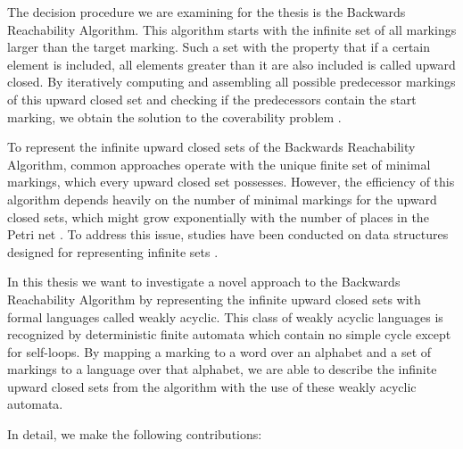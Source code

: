 The decision procedure we are examining for the thesis is the Backwards Reachability Algorithm. This algorithm starts with the infinite set of all markings larger than the target marking. Such a set with the property that if a certain element is included, all elements greater than it are also included is called upward closed. By iteratively computing and assembling all possible predecessor markings of this upward closed set and checking if the predecessors contain the start marking, we obtain the solution to the coverability problem \cite{abdulla_96}. 

To represent the infinite upward closed sets of the Backwards Reachability Algorithm, common approaches operate with the unique finite set of minimal markings, which every upward closed set possesses. However, the efficiency of this algorithm depends heavily on the number of minimal markings for the upward closed sets, which might grow exponentially with the number of places in the Petri net \cite{delzanno_00}. To address this issue, studies have been conducted on data structures designed for representing infinite sets \cite{wolper_98, moller_99, delzanno_04}.

%



In this thesis we want to investigate a novel approach to the Backwards Reachability Algorithm by representing the infinite upward closed sets with formal languages called weakly acyclic. This class of weakly acyclic languages is recognized by deterministic finite automata which contain no simple cycle except for self-loops.
By mapping a marking to a word over an alphabet and a set of markings to a language over that alphabet, we are able to describe the infinite upward closed sets from the algorithm with the use of these weakly acyclic automata.
 
In detail, we make the following contributions:

